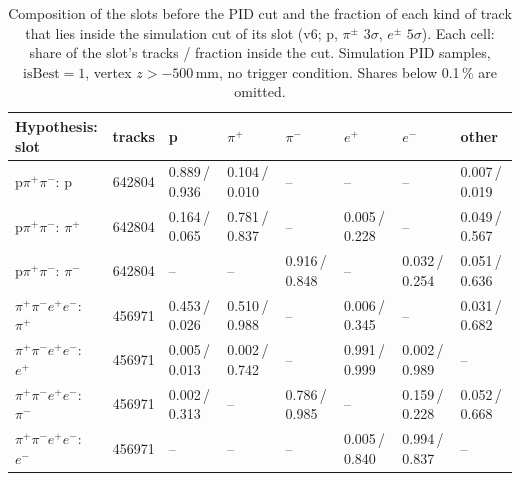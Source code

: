 \begin{table}[H]
\centering
\caption{Composition of the slots before the PID cut and the fraction of each kind of track that lies inside the simulation cut of its slot (v6; p, $\pi^\pm$ $3\sigma$, $e^\pm$ $5\sigma$). Each cell: share of the slot's tracks / fraction inside the cut. Simulation PID samples, $\mathrm{isBest}=1$, vertex $z>-500$\,mm, no trigger condition. Shares below 0.1\,\% are omitted.}
\label{tab:inside}
\footnotesize
\setlength{\tabcolsep}{4pt}
\begin{tabular}{@{}l r l l l l l l@{}}
\toprule
Hypothesis: slot & tracks & p & $\pi^+$ & $\pi^-$ & $e^+$ & $e^-$ & other \\
\midrule
p$\pi^+\pi^-$: p & 642804 & 0.889\,/\,0.936 & 0.104\,/\,0.010 & -- & -- & -- & 0.007\,/\,0.019 \\
p$\pi^+\pi^-$: $\pi^+$ & 642804 & 0.164\,/\,0.065 & 0.781\,/\,0.837 & -- & 0.005\,/\,0.228 & -- & 0.049\,/\,0.567 \\
p$\pi^+\pi^-$: $\pi^-$ & 642804 & -- & -- & 0.916\,/\,0.848 & -- & 0.032\,/\,0.254 & 0.051\,/\,0.636 \\
\midrule
$\pi^+\pi^-e^+e^-$: $\pi^+$ & 456971 & 0.453\,/\,0.026 & 0.510\,/\,0.988 & -- & 0.006\,/\,0.345 & -- & 0.031\,/\,0.682 \\
$\pi^+\pi^-e^+e^-$: $e^+$ & 456971 & 0.005\,/\,0.013 & 0.002\,/\,0.742 & -- & 0.991\,/\,0.999 & 0.002\,/\,0.989 & -- \\
$\pi^+\pi^-e^+e^-$: $\pi^-$ & 456971 & 0.002\,/\,0.313 & -- & 0.786\,/\,0.985 & -- & 0.159\,/\,0.228 & 0.052\,/\,0.668 \\
$\pi^+\pi^-e^+e^-$: $e^-$ & 456971 & -- & -- & -- & 0.005\,/\,0.840 & 0.994\,/\,0.837 & -- \\
\bottomrule
\end{tabular}
\end{table}
